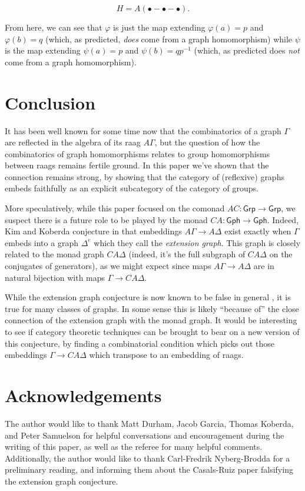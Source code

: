 \documentclass[12pt]{article}
\theoremstyle{definition}
\theoremstyle{theorem}
\newcommand*{\catFont}[1]{\mathsf{#1}}
\newcommand{\Grp}{\catFont{Grp}}
\begin{document}
\[ H = A(\bullet - \bullet - \bullet) .\]

From here, we can see that $\varphi$ is just the map extending
$\varphi(a)=p$ and $\varphi(b)=q$ 
(which, as predicted, \emph{does} come from a graph homomorphism) while 
$\psi$ is the map extending $\psi(a)=p$ and $\psi(b)=qp^{-1}$ 
(which, as predicted does \emph{not} come from a graph homomorphism).

\section{Conclusion}
\label{conclusion}

It has been well known for some time now that the combinatorics of a graph
$\Gamma$ are reflected in the algebra of its raag $A\Gamma$, but the 
question of how the combinatorics of graph homomorphisms relates to 
group homomorphisms between raags remains fertile ground. In this paper we've 
shown that the connection remains strong, by showing that the category of
(reflexive) graphs embeds faithfully as an explicit subcategory of 
the category of groups. 

More speculatively, while this paper focused on the comonad $AC : \Grp \to \Grp$,
we suspect there is a future role to be played by the monad 
$CA : \mathsf{Gph} \to \mathsf{Gph}$. Indeed, Kim and Koberda conjecture 
in \cite{kimEmbedabilityRightangledArtin2013} that embeddings 
$A\Gamma \to A \Delta$ exist exactly when $\Gamma$ embeds into a 
graph $\Delta^e$ which they call the \emph{extension graph}.
This graph is closely related to the monad graph $CA\Delta$ 
(indeed, it's the full subgraph of $CA\Delta$ on the conjugates of generators), 
as we might expect since maps $A\Gamma \to A \Delta$ are in natural 
bijection with maps $\Gamma \to CA \Delta$. 

While the extension graph conjecture is now known to be false in general
\cite{casals-ruizEmbedddingsPartiallyCommutative2013}, it is true for 
many classes of graphs. In some sense this is likely ``because of'' the close 
connection of the extension graph with the monad graph. It would be interesting 
to see if category theoretic techniques can be brought to bear on a new version 
of this conjecture, by finding a combinatorial condition which picks out those 
embeddings $\Gamma \to CA \Delta$ which transpose to an embedding of raags.

\section*{Acknowledgements}

The author would like to thank Matt Durham, Jacob Garcia, Thomas Koberda, and 
Peter Samuelson for helpful conversations and encouragement during the 
writing of this paper, as well as the referee for many helpful comments. 
Additionally, the author would like to thank 
Carl-Fredrik Nyberg-Brodda for a preliminary reading, and informing them 
about the Casals-Ruiz paper falsifying the extension graph conjecture.


\newpage


\end{document}
